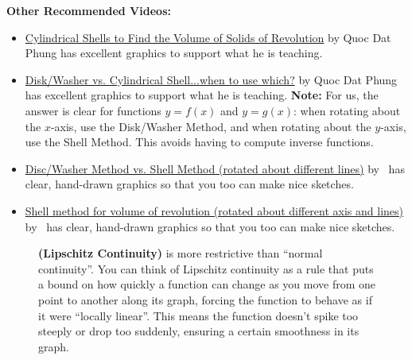 \textbf{Other Recommended Videos:}
\begin{itemize}

\item \href{https://youtu.be/E6Yh0rli6do}{Cylindrical Shells to Find the Volume of Solids of Revolution} by Quoc Dat Phung has excellent graphics to support what he is teaching. 


\item \href{https://youtu.be/M85_r3pZ5YA}{Disk/Washer vs. Cylindrical Shell...when to use which?} by Quoc Dat Phung has excellent graphics to support what he is teaching. \textbf{Note:} For us, the answer is clear for functions $y=f(x)$ and $y=g(x)$: when rotating about the $x$-axis, use the Disk/Washer Method, and when rotating about the $y$-axis, use the Shell Method. This avoids having to compute inverse functions.

\item \href{https://youtu.be/ydyXf01WNYA}{Disc/Washer Method vs. Shell Method (rotated about different lines)} by \bprp ~has clear, hand-drawn graphics so that you too can make nice sketches.

\item \href{https://youtu.be/cxj0OfZTWEo}{Shell method for volume of revolution (rotated about different axis and lines)} by \bprp ~has clear, hand-drawn graphics so that you too can make nice sketches.

\end{itemize}

\newpage


\begin{figure}[htb]%
\centering
{}%
\hfill
{}%
\hfill
\caption[]{\textbf{(Lipschitz Continuity)} is more restrictive than ``normal continuity''. You can think of Lipschitz continuity as a rule that puts a bound on how quickly a function can change as you move from one point to another along its graph, forcing the function to behave as if it were ``locally linear''. This means the function doesn’t spike too steeply or drop too suddenly, ensuring a certain smoothness in its graph.}
    \label{fig:LipschitxContinuousFunction}
\end{figure}

